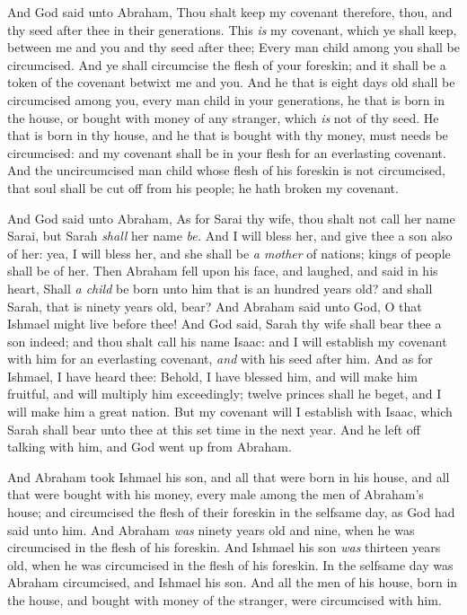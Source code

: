 \documentclass[11pt,letterpaper,oneside]{memoir}
\begin{document}
And God said unto Abraham, Thou shalt keep my covenant therefore, thou,
and thy seed after thee in their generations. This \emph{is} my
covenant, which ye shall keep, between me and you and thy seed after
thee; Every man child among you shall be circumcised. And ye shall
circumcise the flesh of your foreskin; and it shall be a token of the
covenant betwixt me and you. And he that is eight days old shall be
circumcised among you, every man child in your generations, he that is
born in the house, or bought with money of any stranger, which \emph{is}
not of thy seed. He that is born in thy house, and he that is bought
with thy money, must needs be circumcised: and my covenant shall be in
your flesh for an everlasting covenant. And the uncircumcised man child
whose flesh of his foreskin is not circumcised, that soul shall be cut
off from his people; he hath broken my covenant.

And God said unto Abraham, As for Sarai thy wife, thou shalt not call
her name Sarai, but Sarah \emph{shall} her name \emph{be. }And I will
bless her, and give thee a son also of her: yea, I will bless her, and
she shall be \emph{a mother} of nations; kings of people shall be of
her. Then Abraham fell upon his face, and laughed, and said in his
heart, Shall \emph{a child} be born unto him that is an hundred years
old? and shall Sarah, that is ninety years old, bear? And Abraham said
unto God, O that Ishmael might live before thee! And God said, Sarah thy
wife shall bear thee a son indeed; and thou shalt call his name Isaac:
and I will establish my covenant with him for an everlasting covenant,
\emph{and} with his seed after him. And as for Ishmael, I have heard
thee: Behold, I have blessed him, and will make him fruitful, and will
multiply him exceedingly; twelve princes shall he beget, and I will make
him a great nation. But my covenant will I establish with Isaac, which
Sarah shall bear unto thee at this set time in the next year. And he
left off talking with him, and God went up from Abraham.

And Abraham took Ishmael his son, and all that were born in his house,
and all that were bought with his money, every male among the men of
Abraham's house; and circumcised the flesh of their foreskin in the
selfsame day, as God had said unto him. And Abraham \emph{was} ninety
years old and nine, when he was circumcised in the flesh of his
foreskin. And Ishmael his son \emph{was} thirteen years old, when he was
circumcised in the flesh of his foreskin. In the selfsame day was
Abraham circumcised, and Ishmael his son. And all the men of his house,
born in the house, and bought with money of the stranger, were
circumcised with him.
\end{document}
